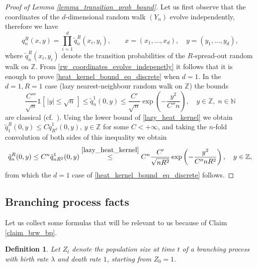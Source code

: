 \documentclass[a4paper,12pt]{article}
\newtheorem  {definition}    [theorem]{Definition}
\begin{document}
\begin{proof}[Proof of Lemma \ref{lemma_transition_prob_bound}] Let us first observe that the coordinates of the $d$-dimensional random walk $(Y_n)$ evolve independently, therefore we have
\begin{equation}\label{rw_coordinates_evolve_indepenetly}
   q_{n}^{R}(x,y)=\prod_{i=1}^d \tilde{q}_n^R(x_i,y_i), \qquad x=(x_1,\dots,x_d), \quad y=(y_1,\dots,y_d),
\end{equation}
where $\tilde{q}_n^R(x_i,y_i)$ denote the transition probabilities of the $R$-spread-out random walk on $\mathbb{Z}$. From \eqref{rw_coordinates_evolve_indepenetly}
it follows that it is enough to prove \eqref{heat_kernel_bound_eq_discrete} when $d=1$. In the $d=1, R=1$ case (lazy nearest-neighbour random walk on $\mathbb{Z}$) the bounds
\begin{equation}\label{lazy_heat_kernel}
\frac{C'''}{\sqrt{n}} \mathds{1}[\, |y| \leq \sqrt{n}\,]   \leq  \tilde{q}^1_n(0,y) \leq \frac{C'}{\sqrt{n}} \exp\left( -\frac{y^2}{ C'' n } \right), \quad y \in \mathbb{Z}, \; n \in \mathbb{N}
\end{equation}
are classical (cf.\ \cite[Section 2]{LL10}). Using the lower bound of \eqref{lazy_heat_kernel} we obtain $\tilde{q}_1^R(0,y) \leq C \tilde{q}^1_{R^2}(0,y), \, y \in \mathbb{Z}$ for some $C<+\infty$, and taking the $n$-fold convolution of both sides of this inequality we obtain
\begin{equation}\label{upper_bound_on_R_spread_out_proof}
  \tilde{q}_n^R(0,y) \leq C^n \tilde{q}^1_{n R^2}(0,y) \stackrel{\eqref{lazy_heat_kernel}}{\leq} C^n \frac{C'}{\sqrt{n R^2 }  } \exp\left( -\frac{y^2}{ C'' n R^2 } \right),
  \quad y \in \mathbb{Z},
\end{equation}
from which the $d=1$ case of  \eqref{heat_kernel_bound_eq_discrete} follows.
\end{proof}



\subsection{Branching process facts}
\label{subsection_brw_facts}

Let us collect some formulas that will be relevant to us because of Claim \ref{claim_brw_bp}.

\begin{definition}\label{def_bp_pop_at_t}
Let $Z_t$ denote the population size at time $t$ of a branching process with birth rate $\lambda$ and death rate $1$, starting from $Z_0=1$.
\end{definition}
\end{document}
